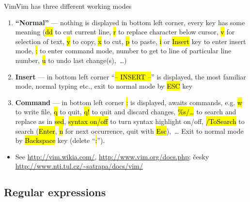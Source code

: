 \documentclass[compress, ucs, xelatex, 11pt, xcolor=svgnames,
  hyperref={
    bookmarks=true,
    unicode=true,
    colorlinks=true,
    pdftitle={Linux, command line and MetaCentrum},
    plainpages=false,
    pdfauthor={Vojtech Zeisek},
    pdfsubject={Course about use of Linux command line, writing shell scripts and using MetaCentrum of CESNET},
    pdfcreator={XeLaTeX},
    pdfkeywords={Linux, GNU, BASH, shell, command line, MetaCentrum},
    linkcolor=DarkRed,
    anchorcolor=DarkBlue,
    citecolor=Indigo,
    filecolor=NavyBlue,
    menucolor=DarkMagenta,
    urlcolor=DarkBlue,
    pdftex},
  url={hyphens, lowtilde} %
  ]{beamer}
\renewcommand{\texttt}[1]{\hl{\ttfamily #1}}
\begin{document}
\begin{frame}{Vim}{Vim has three different working modes}
  \begin{enumerate}
    \item \textbf{``Normal''} --- nothing is displayed in bottom left corner, every key has some meaning (\texttt{dd} to cut current line, \texttt{r} to replace character below cursor, \texttt{v} for selection of text, \texttt{y} to copy, \texttt{x} to cut, \texttt{p} to paste, \texttt{i} or \texttt{Insert} key to enter insert mode, \texttt{:} to enter command mode, number to get to line of particular line number, \texttt{u} to undo last change(s),~\ldots)
    \item \textbf{Insert} --- in bottom left corner ``\texttt{-- INSERT --}'' is displayed, the most familiar mode, normal typing etc., exit to normal mode by \texttt{ESC} key
    \item \textbf{Command} --- in bottom left corner \texttt{:} is displayed, awaits commands, e.g. \texttt{w} to write file, \texttt{q} to quit, \texttt{q!} to quit and discard changes, \texttt{\%s/\ldots} to search and replace as in \texttt{sed}, \texttt{syntax on/off} to turn syntax highlight on/off, \texttt{/ToSearch} to search (\texttt{Enter}, \texttt{n} for next occurrence, quit with \texttt{Esc}),~\ldots{ }Exit to normal mode by \texttt{Backspace} key (delete ``\texttt{:}'').
  \end{enumerate}
  \begin{itemize}
    \item See \url{http://vim.wikia.com/}, \url{http://www.vim.org/docs.php}; česky \url{http://www.nti.tul.cz/~satrapa/docs/vim/}
  \end{itemize}
\end{frame}

\subsection{Regular expressions} %
\end{document}
